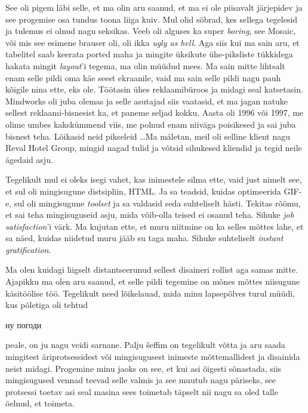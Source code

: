  
See oli pigem läbi selle, et ma olin aru saanud, et ma ei ole piisavalt järjepidev ja see progemise osa  tundus toona liiga kuiv. Mul olid sõbrad, kes sellega tegelesid ja tulemus ei olnud nagu seksikas. Veeb oli alguses ka super \emph{boring}, see Mosaic, või mis see esimene brauser oli, oli ikka \emph{ugly as hell}. Aga siis kui ma sain aru, et tabelitel saab keerata ported maha ja  mingite üksikute ühe-piksliste tükkidega hakata mingit \emph{layout}'i tegema,  ma olin müüdud mees. Ma sain mitte lihtsalt enam selle pildi oma käe seest ekraanile, vaid ma sain selle pildi nagu pauh kõigile nina ette, eks ole.  Töötasin ühes reklaamibüroos ja midagi  seal katsetasin. Mindworks oli juba olemas ja selle asutajad siis vaatasid, et ma jagan natuke sellest reklaami-bisnesist ka, et paneme seljad kokku. Aasta oli 1996 või 1997, me olime umbes kakskümmend viis, me polnud enam niiväga poisikesed ja sai juba bisnest teha. Lõikasid neid pikseleid \ldots Ma mäletan, meil oli selline klient nagu Reval Hotel Group, mingid nagad tulid ja võtsid sihukesed kliendid ja tegid neile ägedaid asju.


Tegelikult mul ei oleks isegi vahet, kas inimestele silma ette, vaid just nimelt see, et sul oli mingisugune distsipliin, HTML. Ja sa teadsid, kuidas optimeerida GIF-e, sul oli mingisugune \emph{toolset} ja sa valdasid seda suhteliselt hästi. Tekitas rõõmu, et  sai teha mingisuguseid asju, mida võib-olla teised ei osanud teha. Sihuke \emph{job satisfaction}'i värk. Ma kujutan ette, et muru niitmine on ka selles mõttes lahe, et sa näed, kuidas niidetud muru jääb su taga maha. Sihuke suhteliselt \emph{instant gratification}.


Ma olen kuidagi liigselt distantseerunud sellest disaineri rollist aga samas mitte. Ajapikku ma olen aru saanud, et selle pildi tegemine on mõnes mõttes niisugune käsitöölise töö. Tegelikult need lõikelauad, mida minu lapsepõlves turul müüdi, kus  põletiga oli tehtud \begin{russian}ну погоди\end{russian} peale, on ju nagu veidi sarnane. Palju  šeffim on tegelikult võtta ja aru saada mingitest äriprotsessidest või mingisugusest inimeste mõttemallidest ja disainida neist midagi. Progemine minu jaoks on see, et kui asi õigesti sõnastada, siis mingisugused vennad teevad selle valmis ja see muutub nagu päriseks, see  protsessi toetav  asi seal masina sees toimetab täpselt nii nagu sa oled talle  öelnud, et toimeta. 

